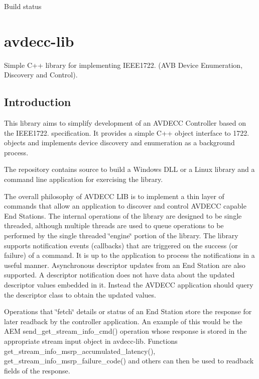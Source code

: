 Build status

\href{https://travis-ci.org/audioscience/avdecc-lib}{\tt }

\section*{avdecc-\/lib }

Simple C++ library for implementing I\+E\+E\+E1722. (A\+VB Device Enumeration, Discovery and Control).

\subsection*{Introduction }

This library aims to simplify development of an A\+V\+D\+E\+CC Controller based on the I\+E\+E\+E1722. specification. It provides a simple C++ object interface to 1722. objects and implements device discovery and enumeration as a background process.

The repository contains source to build a Windows D\+LL or a Linux library and a command line application for exercising the library.

The overall philosophy of A\+V\+D\+E\+CC L\+IB is to implement a thin layer of commands that allow an application to discover and control A\+V\+D\+E\+CC capable End Stations. The internal operations of the library are designed to be single threaded, although multiple threads are used to queue operations to be performed by the single threaded \char`\"{}engine\char`\"{} portion of the library. The library supports notification events (callbacks) that are triggered on the success (or failure) of a command. It is up to the application to process the notifications in a useful manner. Asynchronous descriptor updates from an End Station are also supported. A descriptor notification does not have data about the updated descriptor values embedded in it. Instead the A\+V\+D\+E\+CC application should query the descriptor class to obtain the updated values.

Operations that \char`\"{}fetch\char`\"{} details or status of an End Station store the response for later readback by the controller application. An example of this would be the A\+EM send\+\_\+get\+\_\+stream\+\_\+info\+\_\+cmd() operation whose response is stored in the appropriate stream input object in avdecc-\/lib. Functions get\+\_\+stream\+\_\+info\+\_\+msrp\+\_\+accumulated\+\_\+latency(), get\+\_\+stream\+\_\+info\+\_\+msrp\+\_\+failure\+\_\+code() and others can then be used to readback fields of the response.

